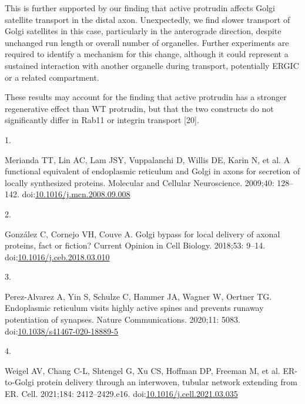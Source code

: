 \documentclass[
  12pt,
  a4paper,
]{article}
\newlength{\cslhangindent}
\newlength{\csllabelwidth}
\newlength{\cslentryspacingunit} %
\newenvironment{CSLReferences}[2] %
 {%
  \setlength{\parindent}{0pt}
  \ifodd #1
  \let\oldpar\par
  \def\par{\hangindent=\cslhangindent\oldpar}
  \fi
  \setlength{\parskip}{#2\cslentryspacingunit}
 }%
 {}
\newcommand{\CSLLeftMargin}[1]{\parbox[t]{\csllabelwidth}{#1}}
\newcommand{\CSLRightInline}[1]{\parbox[t]{\linewidth - \csllabelwidth}{#1}\break}
\begin{document}
This is further supported by our finding that active protrudin affects
Golgi satellite transport in the distal axon. Unexpectedly, we find
slower transport of Golgi satellites in this case, particularly in the
anterograde direction, despite unchanged run length or overall number of
organelles. Further experiments are required to identify a mechanism for
this change, although it could represent a sustained interaction with
another organelle during transport, potentially ERGIC or a related
compartment.

These results may account for the finding that active protrudin has a
stronger regenerative effect than WT protrudin, but that the two
constructs do not significantly differ in Rab11 or integrin transport
{[}20{]}.

\hypertarget{refs}{}
\begin{CSLReferences}{0}{0}
\leavevmode{}%
\CSLLeftMargin{1. }%
\CSLRightInline{Merianda TT, Lin AC, Lam JSY, Vuppalanchi D, Willis DE,
Karin N, et al. A functional equivalent of endoplasmic reticulum and
{Golgi} in axons for secretion of locally synthesized proteins.
Molecular and Cellular Neuroscience. 2009;40: 128--142.
doi:\href{https://doi.org/10.1016/j.mcn.2008.09.008}{10.1016/j.mcn.2008.09.008}}

\leavevmode{}%
\CSLLeftMargin{2. }%
\CSLRightInline{González C, Cornejo VH, Couve A. Golgi bypass for local
delivery of axonal proteins, fact or fiction? Current Opinion in Cell
Biology. 2018;53: 9--14.
doi:\href{https://doi.org/10.1016/j.ceb.2018.03.010}{10.1016/j.ceb.2018.03.010}}

\leavevmode{}%
\CSLLeftMargin{3. }%
\CSLRightInline{Perez-Alvarez A, Yin S, Schulze C, Hammer JA, Wagner W,
Oertner TG. Endoplasmic reticulum visits highly active spines and
prevents runaway potentiation of synapses. Nature Communications.
2020;11: 5083.
doi:\href{https://doi.org/10.1038/s41467-020-18889-5}{10.1038/s41467-020-18889-5}}

\leavevmode{}%
\CSLLeftMargin{4. }%
\CSLRightInline{Weigel AV, Chang C-L, Shtengel G, Xu CS, Hoffman DP,
Freeman M, et al. {ER-to-Golgi} protein delivery through an interwoven,
tubular network extending from {ER}. Cell. 2021;184: 2412--2429.e16.
doi:\href{https://doi.org/10.1016/j.cell.2021.03.035}{10.1016/j.cell.2021.03.035}}


\end{CSLReferences}
\end{document}
